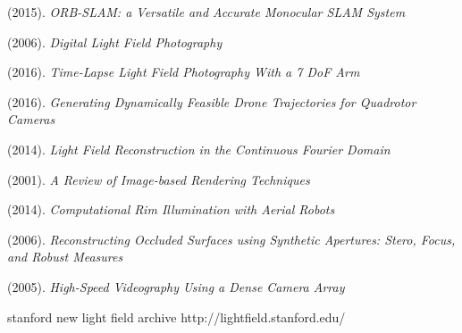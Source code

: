 \documentclass[12pt]{report}
\begin{document}
\begin{thebibliography}{10}
	(2015). \emph{ORB-SLAM: a Versatile and Accurate Monocular SLAM System}

	(2006). \emph{Digital Light Field Photography}	

	(2016). \emph{Time-Lapse Light Field Photography With a 7 DoF Arm}

	(2016). \emph{Generating Dynamically Feasible Drone Trajectories for Quadrotor Cameras}

	(2014). \emph{Light Field Reconstruction in the Continuous Fourier Domain}

	(2001). \emph{A Review of Image-based Rendering Techniques}

	(2014). \emph{Computational Rim Illumination with Aerial Robots}

	(2006). \emph{Reconstructing Occluded Surfaces using Synthetic Apertures: Stero, Focus, and Robust Measures} 
	
	(2005). \emph{High-Speed Videography Using a Dense Camera Array}

stanford new light field archive http://lightfield.stanford.edu/

\end{thebibliography}
\end{document}
